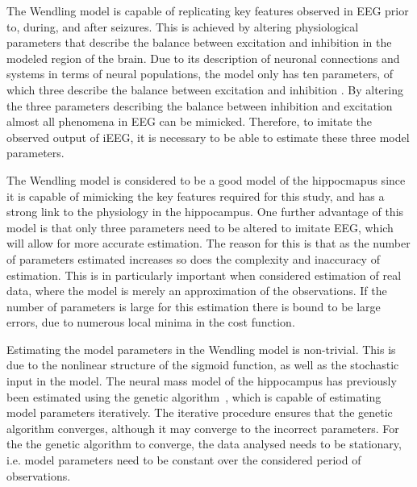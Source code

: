 
The Wendling model is capable of replicating key features observed in EEG prior to, during, and after seizures. This is achieved by altering physiological parameters that describe the balance between excitation and inhibition in the modeled region of the brain. Due to its description of neuronal connections and systems in terms of neural populations, the model only has ten parameters, of which three describe the balance between excitation and inhibition \citep{wendling2002epileptic}. By altering the three parameters describing the balance between inhibition and excitation almost all phenomena in EEG can be mimicked. Therefore, to imitate the observed output of iEEG, it is necessary to be able to estimate these three model parameters.

The Wendling model is considered to be a good model of the hippocmapus since it is capable of mimicking the key features required for this study, and has a strong link to the physiology in the hippocampus. One further advantage of this model is that only three parameters need to be altered to imitate EEG, which will allow for more accurate estimation. The reason for this is that as the number of parameters estimated increases so does the complexity and inaccuracy of estimation. This is in particularly important when considered estimation of real data, where the model is merely an approximation of the observations. If the number of parameters is large for this estimation there is bound to be large errors, due to numerous local minima in the cost function.



Estimating the model parameters in the Wendling model is non-trivial. This is due to the nonlinear structure of the sigmoid function, as well as the stochastic input in the model. The neural mass model of the hippocampus has previously been estimated using the genetic algorithm~\citep{wendling2005interictal}, which is capable of estimating model parameters iteratively. The iterative procedure ensures that the genetic algorithm converges, although it may converge to the incorrect parameters. For the the genetic algorithm to converge, the data analysed needs to be stationary, i.e. model parameters need to be constant over the considered period of observations. 

